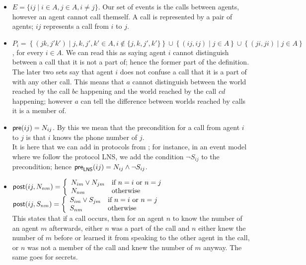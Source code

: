 \documentclass[ %
                    author={Leo Poulson},
                supervisor={Dr. Steven Ramsay},
                    degree={BSc},
                     title={Epistemic Planning for the Dynamic Gossip problem},
                  subtitle={},
                      year={2019} ]{dissertation}
\begin{document}
\begin{itemize}
\item $E = \{ij \mid i \in A, j \in A, i \not = j\}$. Our set of events is the
  calls between agents, however an agent cannot call themself. A call is
  represented by a pair of agents; $ij$ represents a call from $i$ to $j$.
\item $P_i = \left\{(jk, j'k') \mid j, k, j', k' \in A, i \not \in \{j, k, j',
    k'\}\right\} \cup \left\{ (ij, ij) \mid j \in A\right\} \cup \left\{ (ji,
    ji) \mid j \in A \right\}$, for every $i \in A$. We can read this as saying
  agent $i$ cannot distinguish between a call that it is not a part of; hence
  the former part of the definition. The later two sets say that agent $i$ does
  not confuse a call that it is a part of with any other call. This means that
  $a$ cannot distinguish between the world reached by the call $bc$ happening
  and the world reached by the call $cd$ happening; however $a$ can tell the
  difference between worlds reached by calls it is a member of.
\item $\textsf{pre}(ij) = N_{ij}$. By this we mean that the precondition for a call from
  agent $i$ to $j$ is that $i$ knows the phone number of $j$. \\
  It is here that we
  can add in protocols from ; for instance, in an event
  model where we follow the protocol \textsf{LNS}, we add the condition $\neg
  S_{ij}$ to the precondition; hence $\textsf{pre}_{\textsf{LNS}}(ij) = N_{ij} \land
  \neg S_{ij}$.
\item $\textsf{post}(ij, N_{nm}) = \left\{ \begin{array}{ll}
                                     N_{im} \lor N_{jm} & \text{if $n = i$ or $n =
                                                     j$} \\
                                     N_{nm} & \text{otherwise} 
                                   \end{array}
                           \right.$ \\
$\textsf{post}(ij, S_{nm}) = \left\{ \begin{array}{ll}
                                     S_{im} \lor S_{jm} & \text{if $n = i$ or $n =
                                                     j$} \\
                                     S_{nm} & \text{otherwise} 
                                   \end{array}
                           \right.$ \\
 This states that if a call occurs, then for an agent $n$ to know the number of
 an agent $m$ afterwards, either $n$ was a part of the call and $n$ either knew the number
 of $m$ before or learned it from speaking to the other agent in the call, or
 $n$ was not a member of the call and knew the number of $m$ anyway. The same
 goes for secrets. 
\end{itemize}
\end{document}

